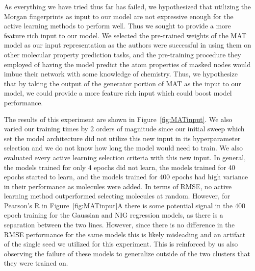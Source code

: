 \documentclass[journal=jmcmar,manuscript=article]{achemso}
\begin{document}
As everything we have tried thus far has failed, we hypothesized that utilizing the Morgan fingerprints as input to our model are not expressive enough for the active learning methods to perform well. Thus we sought to provide a more feature rich input to our model. We selected the pre-trained weights of the MAT\cite{MAT} model as our input representation as the authors were successful in using them on other molecular property prediction tasks, and the pre-training procedure they employed of having the model predict the atom properties of masked nodes would imbue their network with some knowledge of chemistry. Thus, we hypothesize that by taking the output of the generator portion of MAT as the input to our model, we could provide a more feature rich input which could boost model performance.

The results of this experiment are shown in Figure~\ref{fig:MATinput}. We also varied our training times by 2 orders of magnitude since our initial sweep which set the model architecture did not utilize this new input in its hyperparameter selection and we do not know how long the model would need to train. We also evaluated every active learning selection criteria with this new input. In general, the models trained for only 4 epochs did not learn, the models trained for 40 epochs started to learn, and the models trained for 400 epochs had high variance in their performance as molecules were added. In terms of RMSE, no active learning method outperformed selecting molecules at random. However, for Pearson's R in Figure~\ref{fig:MATinput}A there is some potential signal in the 400 epoch training for the Gaussian and NIG regression models, as there is a separation between the two lines. However, since there is no difference in the RMSE performance for the same models this is likely misleading and an artifact of the single seed we utilized for this experiment. This is reinforced by us also observing the failure of these models to generalize outside of the two clusters that they were trained on.
\end{document}
